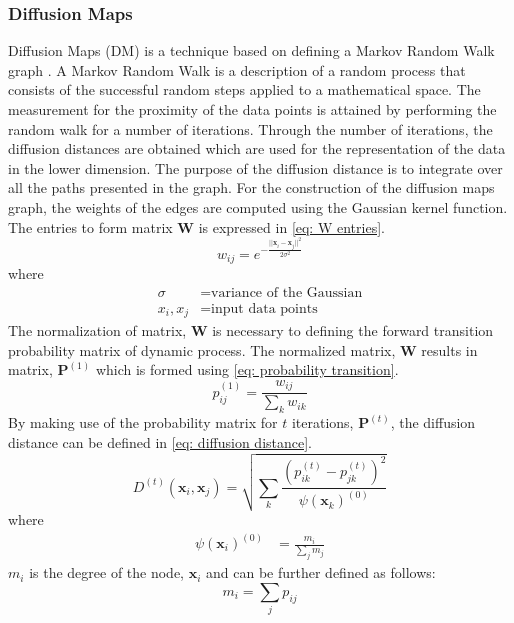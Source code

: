\documentclass[11pt,twocolumn]{witseiepaper}
\begin{document}
	\subsubsection{Diffusion Maps}
	Diffusion Maps (DM) is a technique based on defining a Markov Random Walk graph \cite{COIFMAN20065}. A Markov Random Walk is a description of a random process that consists of the successful random steps applied to a mathematical space. The measurement for the proximity of the data points is attained by performing the random walk for a number of iterations. Through the number of iterations, the diffusion distances are obtained which are used for the representation of the data in the lower dimension. The purpose of the diffusion distance is to integrate over all the paths presented in the graph. For the construction of the diffusion maps graph, the weights of the edges are computed using the Gaussian kernel function. The entries to form matrix \textbf{W} is expressed in \eqref{eq: W entries}.
	\begin{equation}
		w_{ij} = e^{-\frac{||\textbf{x}_i - \textbf{x}_j||^2}{2\sigma^2}}
		\label{eq: W entries}
	\end{equation}
	where
	\begin{align*}
		\sigma &= \text{variance of the Gaussian}\\
		x_i, x_j &= \text{input data points}
	\end{align*}
	The normalization of matrix, \textbf{W} is necessary to defining the forward transition probability matrix of dynamic process. The normalized matrix, \textbf{W} results in matrix, $\textbf{P}^{(1)}$ which is formed using \eqref{eq: probability transition}.
	\begin{equation}
		p_{ij}^{(1)} = \frac{w_{ij}}{\sum_{k}w_{ik}}
		\label{eq: probability transition}
	\end{equation}
	By making use of the probability matrix for $t$ iterations, $\textbf{P}^{(t)}$, the diffusion distance can be defined in \eqref{eq: diffusion distance}.
	\begin{equation}
		D^{(t)}(\textbf{x}_i, \textbf{x}_j) = \sqrt{\sum_{k}\frac{(p_{ik}^{(t)}-p_{jk}^{(t)})^2}{\psi(\textbf{x}_k)^{(0)}}}
		\label{eq: diffusion distance}
	\end{equation}
	where
	\begin{align*}
		\psi(\textbf{x}_i)^{(0)} &= \frac{m_i}{\sum_{j}m_j}
	\end{align*}
	$m_i$ is the degree of the node, $\textbf{x}_i$ and can be further defined as follows:
	\[m_i = \sum_{j}p_{ij}\]
\end{document}
